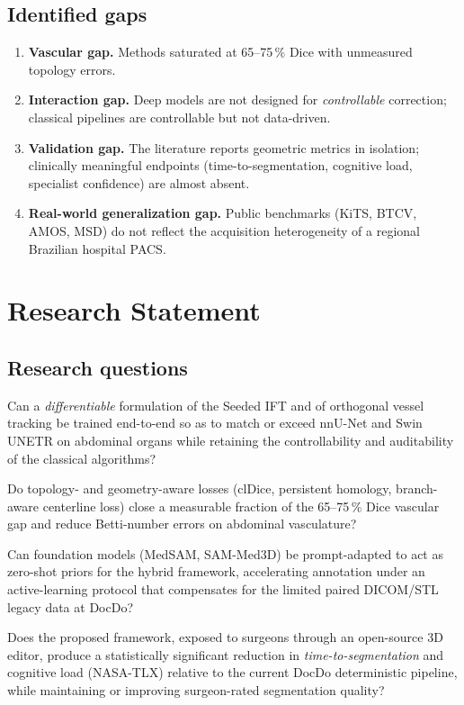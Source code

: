 \documentclass[a4paper,11pt,twoside]{article}
\begin{document}
\subsection{Identified gaps}

\begin{enumerate}
  \item \textbf{Vascular gap.} Methods saturated at 65--75\,\% Dice with
        unmeasured topology errors.
  \item \textbf{Interaction gap.} Deep models are not designed for
        \emph{controllable} correction; classical pipelines are
        controllable but not data-driven.
  \item \textbf{Validation gap.} The literature reports geometric metrics in
        isolation; clinically meaningful endpoints (time-to-segmentation,
        cognitive load, specialist confidence) are almost absent.
  \item \textbf{Real-world generalization gap.} Public benchmarks
        (KiTS, BTCV, AMOS, MSD) do not reflect the acquisition heterogeneity
        of a regional Brazilian hospital PACS.
\end{enumerate}

\section{Research Statement}

\subsection{Research questions}

\begin{description}[leftmargin=1.6em,style=nextline]
  \item[RQ1] Can a \emph{differentiable} formulation of the Seeded IFT and of
       orthogonal vessel tracking be trained end-to-end so as to match or
       exceed nnU-Net and Swin UNETR on abdominal organs while retaining the
       controllability and auditability of the classical algorithms?
  \item[RQ2] Do topology- and geometry-aware losses (clDice, persistent
       homology, branch-aware centerline loss) close a measurable fraction of
       the 65--75\,\% Dice vascular gap and reduce Betti-number errors on
       abdominal vasculature?
  \item[RQ3] Can foundation models (MedSAM, SAM-Med3D) be prompt-adapted to
       act as zero-shot priors for the hybrid framework, accelerating
       annotation under an active-learning protocol that compensates for the
       limited paired DICOM/STL legacy data at DocDo?
  \item[RQ4] Does the proposed framework, exposed to surgeons through an
       open-source 3D editor, produce a statistically significant reduction
       in \emph{time-to-segmentation} and cognitive load (NASA-TLX) relative
       to the current DocDo deterministic pipeline, while maintaining or
       improving surgeon-rated segmentation quality?
\end{description}
\end{document}
